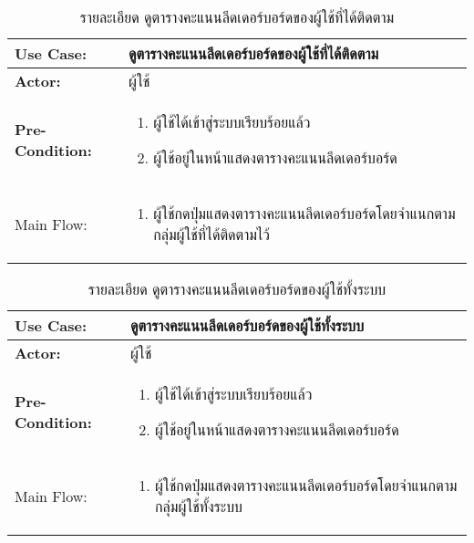 \begin{table}
    \caption{รายละเอียด ดูตารางคะแนนลีดเดอร์บอร์ดของผู้ใช้ที่ได้ติดตาม}
    \begin{tabularx}{\textwidth}{ | >{\centering\bf} p{3cm} | X |}
        \hline
        Use Case: & ดูตารางคะแนนลีดเดอร์บอร์ดของผู้ใช้ที่ได้ติดตาม \\\hline
        Actor: & ผู้ใช้ \\\hline
        Pre-Condition: &
        \begin{enumerate}[table]
            \item ผู้ใช้ได้เข้าสู่ระบบเรียบร้อยแล้ว
            \item ผู้ใช้อยู่ในหน้าแสดงตารางคะแนนลีดเดอร์บอร์ด         
        \end{enumerate} \\\hline
        
        Main Flow: & 
        \begin{enumerate}[table]
            \item ผู้ใช้กดปุ่มแสดงตารางคะแนนลีดเดอร์บอร์ดโดยจำแนกตามกลุ่มผู้ใช้ที่ได้ติดตามไว้
        \end{enumerate}\\\hline
    \end{tabularx}
\end{table}


\begin{table}
    \caption{รายละเอียด ดูตารางคะแนนลีดเดอร์บอร์ดของผู้ใช้ทั้งระบบ}
    \begin{tabularx}{\textwidth}{ | >{\centering\bf} p{3cm} | X |}
        \hline
        Use Case: & ดูตารางคะแนนลีดเดอร์บอร์ดของผู้ใช้ทั้งระบบ \\\hline
        Actor: & ผู้ใช้ \\\hline
        Pre-Condition: &
        \begin{enumerate}[table]
            \item ผู้ใช้ได้เข้าสู่ระบบเรียบร้อยแล้ว
            \item ผู้ใช้อยู่ในหน้าแสดงตารางคะแนนลีดเดอร์บอร์ด            
        \end{enumerate} \\\hline
        
        Main Flow: & 
        \begin{enumerate}[table]
            \item ผู้ใช้กดปุ่มแสดงตารางคะแนนลีดเดอร์บอร์ดโดยจำแนกตามกลุ่มผู้ใช้ทั้งระบบ
        \end{enumerate}\\\hline
    \end{tabularx}
\end{table}




